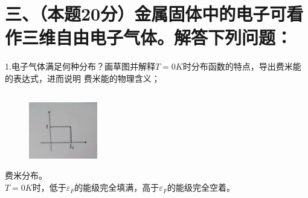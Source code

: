 \documentclass[UTF8]{ctexart}
\begin{document}
\section*{三、（本题20分）金属固体中的电子可看作三维自由电子气体。解答下列问题：}
1.电子气体满足何种分布？画草图并解释$T=0K$时分布函数的特点，导出费米能的表达式，进而说明
费米能的物理含义；\\
\subsection*{}
\begin{figure}
  \includegraphics[width=3cm]{3_1.jpg}
\end{figure}
费米分布。\\
$T=0K$时，低于$\varepsilon_F$的能级完全填满，高于$\varepsilon_F$的能级完全空着。\\
\end{document}
